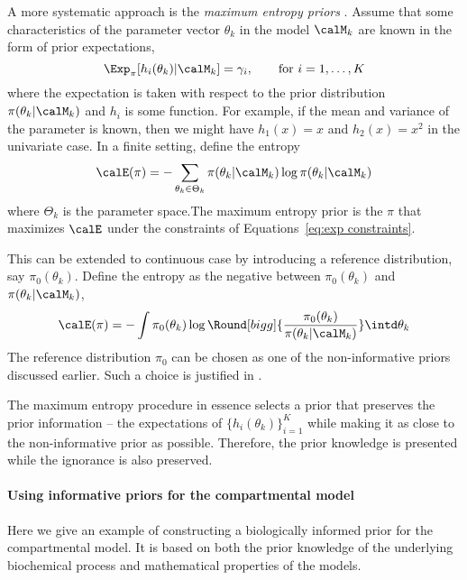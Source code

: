 A more systematic approach is the \emph{maximum entropy priors} \cite{Jaynes:1989vx}. Assume that some characteristics of the parameter vector $\theta_k$ in the model $\calM_k$ are known in the form of prior expectations,
\begin{equation}
  \Exp_{\pi}[h_i(\theta_k)|\calM_k] = \gamma_i, \qquad\text{for } i =
  1,\dots,K
  \label{eq:exp constraints}
\end{equation}
where the expectation is taken with respect to the prior distribution $\pi(\theta_k|\calM_k)$ and $h_i$ is some function. For example, if the mean and variance of the parameter is known, then we might have $h_1(x) = x$ and $h_2(x) = x^2$ in the univariate case. In a finite setting, define the entropy
\begin{equation}
  \calE(\pi) = -\sum_{\theta_k\in\Theta_k}
  \pi(\theta_k|\calM_k)\log \pi (\theta_k|\calM_k)
\end{equation}
where $\Theta_k$ is the parameter space.The maximum entropy prior is the $\pi$ that maximizes $\calE$ under the constraints of Equations~\eqref{eq:exp constraints}.

This can be extended to  continuous case by introducing a reference distribution, say $\pi_0(\theta_k)$. Define the entropy as the negative \kld between $\pi_0(\theta_k)$ and $\pi(\theta_k|\calM_k)$,
\begin{equation}
  \calE(\pi) = -\int \pi_0(\theta_k)\log\Round[bigg]{
    \frac{\pi_0(\theta_k)}{\pi(\theta_k|\calM_k)}}\intd\theta_k
\end{equation}
The reference distribution $\pi_0$ can be chosen as one of the non-informative priors discussed earlier. Such a choice is justified in \cite[][chap.~9]{Robert:2007tc}.

The maximum entropy procedure in essence selects a prior that preserves the prior information -- the expectations of $\{h_i(\theta_k)\}_{i=1}^K$ while making it as close to the non-informative prior as possible. Therefore, the prior knowledge is presented while the ignorance is also preserved.

\paragraph{Using informative priors for the \pet compartmental model}

Here we give an example of constructing a biologically informed prior for the \pet compartmental model. It is based on both the prior knowledge of the underlying biochemical process and mathematical properties of the models.

